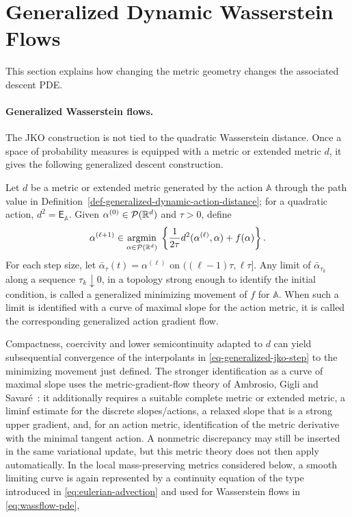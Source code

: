 \section{Generalized Dynamic Wasserstein Flows}
\label{sec-generalized-dynamic-wasserstein-flows}

This section explains how changing the metric geometry changes the associated descent PDE.

\paragraph{Generalized Wasserstein flows.}
The JKO construction is not tied to the quadratic Wasserstein distance. Once a space of probability measures is equipped with a metric or extended metric \(d\), it gives the following generalized descent construction.
\begin{defn}\label{def-generalized-action-gradient-flow}
Let $d$ be a metric or extended metric generated by the action $\mathbb A$ through the path value in Definition~\ref{def-generalized-dynamic-action-distance}; for a quadratic action, $d^2=\mathsf E_{\mathbb A}$. Given \(\alpha^{(0)}\in\mathcal{P}(\mathbb{R}^d)\) and \(\tau>0\), define
\begin{equation}\label{eq-generalized-jko-step}
	\alpha^{(\ell+1)}
	\in
	\underset{\alpha\in\mathcal{P}(\mathbb{R}^d)}{\operatorname{argmin}}\;
	\left\{\frac{1}{2\tau}d^2(\alpha^{(\ell)},\alpha)+f(\alpha)\right\}.
\end{equation}
For each step size, let \(\bar\alpha_\tau(t)=\alpha^{(\ell)}\) on \(((\ell-1)\tau,\ell\tau]\). Any limit of \(\bar\alpha_{\tau_k}\) along a sequence \(\tau_k\downarrow0\), in a topology strong enough to identify the initial condition, is called a generalized minimizing movement of \(f\) for \(\mathbb A\). When such a limit is identified with a curve of maximal slope for the action metric, it is called the corresponding generalized action gradient flow.
\end{defn}
Compactness, coercivity and lower semicontinuity adapted to \(d\) can yield subsequential convergence of the interpolants in \eqref{eq-generalized-jko-step} to the minimizing movement just defined. The stronger identification as a curve of maximal slope uses the metric-gradient-flow theory of Ambrosio, Gigli and Savar\'e~\cite{ambrosio2006gradient,gigli2011user}: it additionally requires a suitable complete metric or extended metric, a liminf estimate for the discrete slopes/actions, a relaxed slope that is a strong upper gradient, and, for an action metric, identification of the metric derivative with the minimal tangent action. A nonmetric discrepancy may still be inserted in the same variational update, but this metric theory does not then apply automatically. In the local mass-preserving metrics considered below, a smooth limiting curve is again represented by a continuity equation of the type introduced in \eqref{eq:eulerian-advection} and used for Wasserstein flows in \eqref{eq:wassflow-pde},
